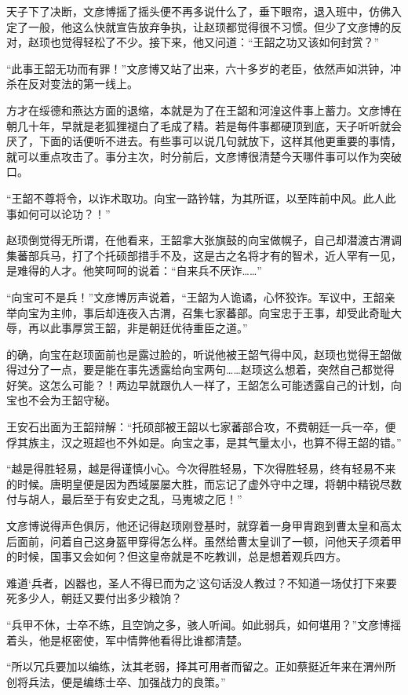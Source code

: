 天子下了决断，文彦博摇了摇头便不再多说什么了，垂下眼帘，退入班中，仿佛入定了一般，他这么快就宣告放弃争执，让赵顼都觉得很不习惯。但少了文彦博的反对，赵顼也觉得轻松了不少。接下来，他又问道：“王韶之功又该如何封赏？”

“此事王韶无功而有罪！”文彦博又站了出来，六十多岁的老臣，依然声如洪钟，冲杀在反对变法的第一线上。

方才在绥德和燕达方面的退缩，本就是为了在王韶和河湟这件事上蓄力。文彦博在朝几十年，早就是老狐狸褪白了毛成了精。若是每件事都硬顶到底，天子听听就会厌了，下面的话便听不进去。有些事可以说几句就放下，这样其他更重要的事情，就可以重点攻击了。事分主次，时分前后，文彦博很清楚今天哪件事可以作为突破口。

“王韶不尊将令，以诈术取功。向宝一路钤辖，为其所诓，以至阵前中风。此人此事如何可以论功？！”

赵顼倒觉得无所谓，在他看来，王韶拿大张旗鼓的向宝做幌子，自己却潜渡古渭调集蕃部兵马，打了个托硕部措手不及，这是古之名将才有的智术，近人罕有一见，是难得的人才。他笑呵呵的说着：“自来兵不厌诈……”

“向宝可不是兵！”文彦博厉声说着，“王韶为人诡谲，心怀狡诈。军议中，王韶亲举向宝为主帅，事后却连夜入古渭，召集七家蕃部。向宝忠于王事，却受此奇耻大辱，再以此事厚赏王韶，非是朝廷优待重臣之道。”

的确，向宝在赵顼面前也是露过脸的，听说他被王韶气得中风，赵顼也觉得王韶做得过分了一点，要是能在事先透露给向宝两句……赵顼这么想着，突然自己都觉得好笑。这怎么可能？！两边早就跟仇人一样了，王韶怎么可能透露自己的计划，向宝也不会为王韶守秘。

王安石出面为王韶辩解：“托硕部被王韶以七家蕃部合攻，不费朝廷一兵一卒，便俘其族主，汉之班超也不外如是。向宝之事，是其气量太小，也算不得王韶的错。”

“越是得胜轻易，越是得谨慎小心。今次得胜轻易，下次得胜轻易，终有轻易不来的时候。唐明皇便是因为西域屡屡大胜，而忘记了虚外守中之理，将朝中精锐尽数付与胡人，最后至于有安史之乱，马嵬坡之厄！”

文彦博说得声色俱厉，他还记得赵顼刚登基时，就穿着一身甲胄跑到曹太皇和高太后面前，问着自己这身盔甲穿得怎么样。虽然给曹太皇训了一顿，问他天子须着甲的时候，国事又会如何？但这皇帝就是不吃教训，总是想着观兵四方。

难道‘兵者，凶器也，圣人不得已而为之’这句话没人教过？不知道一场仗打下来要死多少人，朝廷又要付出多少粮饷？

“兵甲不休，士卒不练，且空饷之多，骇人听闻。如此弱兵，如何堪用？”文彦博摇着头，他是枢密使，军中情弊他看得比谁都清楚。

“所以冗兵要加以编练，汰其老弱，择其可用者而留之。正如蔡挺近年来在渭州所创将兵法，便是编练士卒、加强战力的良策。”

